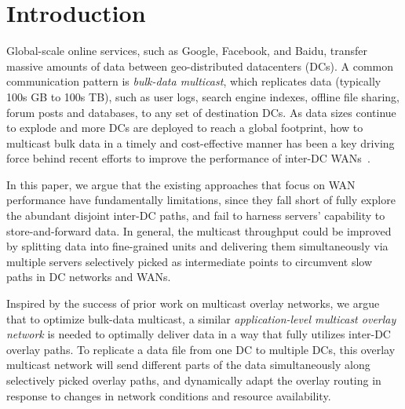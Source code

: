 \section{Introduction}

Global-scale online services, such as Google, Facebook, and
Baidu, transfer massive amounts of data between geo-distributed
datacenters (DCs).
A common communication pattern is {\em bulk-data multicast},
which replicates data
(typically 100s GB to 100s TB), such as user
logs, search engine indexes, offline file sharing, forum posts and databases,
to any set of destination DCs.
As data sizes continue to explode and more DCs are deployed to
reach a global footprint, how to multicast bulk data in a timely
and cost-effective manner has been a key driving force behind
recent efforts to improve the performance of inter-DC
WANs~\cite{jain2013b4,kumar2015bwe,hong2013achieving,
Zhang2015Guaranteeing,Savage1999The}.



In this paper, we argue that the existing approaches that focus
on WAN performance have fundamentally limitations,
since they fall short of fully explore the abundant
disjoint inter-DC paths, and fail to harness servers'
capability to store-and-forward data.
In general, the multicast throughput could be improved by
splitting data into fine-grained units and delivering them
simultaneously via multiple servers selectively picked as
intermediate points to circumvent slow paths in DC
networks and WANs.


Inspired by the success of prior work on multicast overlay
networks, we argue that to optimize bulk-data multicast,
a similar {\em application-level multicast
overlay network} is needed to optimally deliver data in a way that
fully utilizes inter-DC overlay paths.
To replicate a data file from one DC to multiple DCs, this overlay
multicast network will send different parts of the data
simultaneously along selectively picked overlay paths, and
dynamically adapt the overlay routing in response to changes in
network conditions and resource availability.


